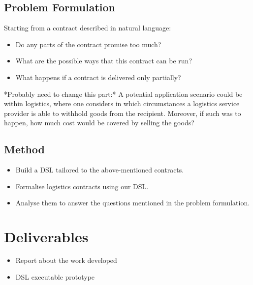 \documentclass{ituthesis}
\begin{document}
\subsection{Problem Formulation}
Starting from a contract described in natural language:
\begin{itemize}
    \item Do any parts of the contract promise too much?
    \item What are the possible ways that this contract can be run?
    \item What happens if a contract is delivered only partially?%
\end{itemize}

*Probably need to change this part:*    
A potential application scenario could be within logistics, where one considers in which circumstances a logistics service provider is able to withhold goods from the recipient. Moreover, if such was to happen, how much cost would be covered by selling the goods?
    

\subsection{Method}
\begin{itemize}
    \item Build a DSL tailored to the above-mentioned contracts.
    \item Formalise logistics contracts using our DSL.
    \item Analyse them to answer the questions mentioned in the problem formulation.
\end{itemize}


\section{Deliverables}
\begin{itemize}
    \item Report about the work developed
    \item DSL executable prototype
\end{itemize}
\end{document}
